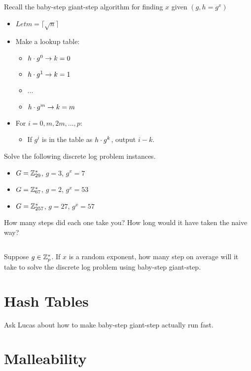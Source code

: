 \documentclass[12pt]{article}
\let\sol=\undefined
\newcommand{\sol}[1]{\begin{proof}\color{red}\textbf[SOLUTION: {#1}]\end{proof}}
\begin{document}
Recall the baby-step giant-step algorithm for finding $x$ given $(g, h = g^x)$

\begin{itemize}
\item $Let m = \lceil \sqrt{n} \rceil$
\item Make a lookup table:
\begin{itemize}
\item $h \cdot g^{0} \to k = 0$
\item $h \cdot g^{1} \to k = 1$
\item ...
\item $h \cdot g^{m} \to k = m$
\end{itemize}
\item For $i = 0, m, 2m, ..., p$:
\begin{itemize}
\item If $g^i$ is in the table as $h \cdot g^k$, output $i - k$.
\end{itemize}

\end{itemize}


Solve the following discrete log problem instances.

\begin{itemize}
\item $G = \mathbb{Z}_{29}^*$, $g=3$, $g^x = 7$ \sol{8}
\item $G = \mathbb{Z}_{67}^*$, $g=2$, $g^x = 53$ \sol{21}
\item $G = \mathbb{Z}_{257}^*$, $g=27$, $g^x = 57$ \sol{42}
\end{itemize}

How many steps did each one take you? How long would it have taken the naive way?

\subsection{}

Suppose $g \in \mathbb{Z}_p^*$. If $x$ is a random exponent, how many step on average will it take to solve the discrete log problem using baby-step giant-step.

\sol{
$1.5 \* \sqrt{p}$
}

\section{Hash Tables}

Ask Lucas about how to make baby-step giant-step actually run fast.

\section{Malleability}
\end{document}
